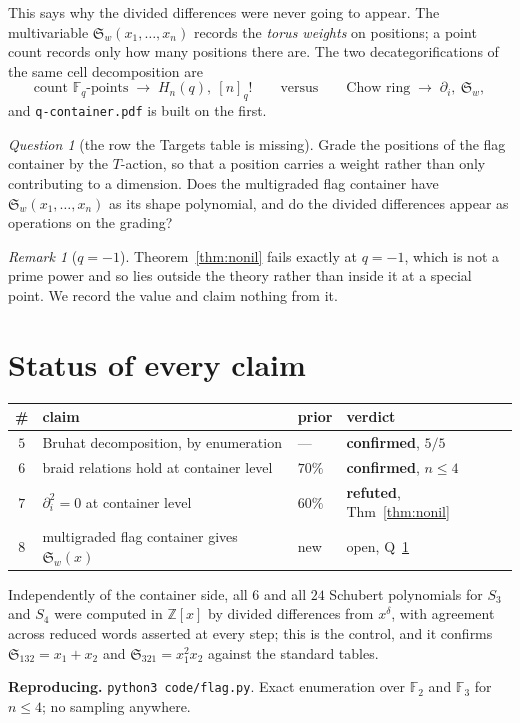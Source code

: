 \documentclass[11pt,a4paper]{article}
\theoremstyle{definition}
\theoremstyle{remark}
\newtheorem{remark}[theorem]{Remark}
\newtheorem{question}[theorem]{Question}
\newcommand{\FF}{\mathbb{F}}
\newcommand{\ZZ}{\mathbb{Z}}
\newcommand{\Schub}{\mathfrak{S}}
\newcommand{\OK}{\textcolor{okgreen}{\textbf{confirmed}}}
\newcommand{\NO}{\textcolor{nored}{\textbf{refuted}}}
\begin{document}
This says why the divided differences were never going to appear. The
multivariable $\Schub_w(x_1, \ldots, x_n)$ records the \emph{torus weights} on
positions; a point count records only how many positions there are. The two
decategorifications of the same cell decomposition are
\[
  \text{count } \FF_q\text{-points} \;\longrightarrow\; H_n(q), \ [n]_q!
  \qquad\text{versus}\qquad
  \text{Chow ring} \;\longrightarrow\; \partial_i, \ \Schub_w ,
\]
and \texttt{q-container.pdf} is built on the first.

\begin{question}[the row the Targets table is missing]\label{q:graded}
Grade the positions of the flag container by the $T$-action, so that a position
carries a weight rather than only contributing to a dimension. Does the
multigraded flag container have $\Schub_w(x_1,\ldots,x_n)$ as its shape
polynomial, and do the divided differences appear as operations on the grading?
\end{question}

\begin{remark}[$q = -1$]
Theorem~\ref{thm:nonil} fails exactly at $q = -1$, which is not a prime power and
so lies outside the theory rather than inside it at a special point. We record
the value and claim nothing from it.
\end{remark}

\section{Status of every claim}

\begin{center}
\small
\begin{tabular}{clll}
\toprule
\# & claim & prior & verdict \\
\midrule
$5$ & Bruhat decomposition, by enumeration & --- & \OK{}, $5/5$ \\
$6$ & braid relations hold at container level & $70\%$ & \OK{}, $n \le 4$ \\
$7$ & $\partial_i^2 = 0$ at container level & $60\%$ & \NO{}, Thm~\ref{thm:nonil} \\
$8$ & multigraded flag container gives $\Schub_w(x)$ & new & open, Q~\ref{q:graded} \\
\bottomrule
\end{tabular}
\end{center}

Independently of the container side, all $6$ and all $24$ Schubert polynomials
for $S_3$ and $S_4$ were computed in $\ZZ[x]$ by divided differences from
$x^\delta$, with agreement across reduced words asserted at every step; this is
the control, and it confirms $\Schub_{132} = x_1 + x_2$ and
$\Schub_{321} = x_1^2 x_2$ against the standard tables.

\medskip
\noindent\textbf{Reproducing.} \texttt{python3 code/flag.py}. Exact enumeration
over $\FF_2$ and $\FF_3$ for $n \le 4$; no sampling anywhere.

\newcommand{\secindresref}{}
\end{document}
